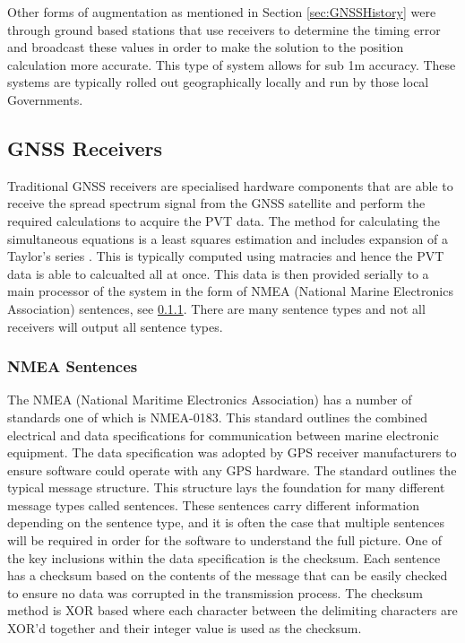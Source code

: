 Other forms of augmentation as mentioned in Section \ref{sec:GNSSHistory} were through ground based stations that use receivers to determine the timing error and broadcast these
values in order to make the solution to the position calculation more accurate. This type of system allows for sub 1m accuracy. These systems are typically rolled out
geographically locally and run by those local Governments.

\subsection{GNSS Receivers}
Traditional GNSS receivers are specialised hardware components that are able to receive the spread spectrum signal from the GNSS satellite and perform the required
calculations to acquire the PVT data. The method for calculating the simultaneous equations is a least squares estimation and includes expansion of a Taylor's series \cite{RN46}.
This is typically computed using matracies and hence the PVT data is able to calcualted all at once.
This data is then provided serially to a main processor of the system in the form of NMEA (National Marine Electronics Association)
sentences, see \ref{subsubsec:NMEA}. There are many sentence types
and not all receivers will output all sentence types.

\subsubsection{NMEA Sentences} \label{subsubsec:NMEA}
The NMEA (National Maritime Electronics Association) has a number of standards one of which is NMEA-0183. This standard outlines the combined electrical and data
specifications for communication between marine electronic equipment. The data specification was adopted by GPS receiver manufacturers to ensure software could operate
with any GPS hardware. The standard outlines the typical message structure. This structure lays the foundation for many different message types called sentences. These
sentences carry different information depending on the sentence type, and it is often the case that multiple sentences will be required in order for the software to
understand the full picture. One of the key inclusions within the data specification is the checksum. Each sentence has a checksum based on the contents of the message
that can be easily checked to ensure no data was corrupted in the transmission process. The checksum method is XOR based where each character between the delimiting
characters are XOR'd together and their integer value is used as the checksum.

